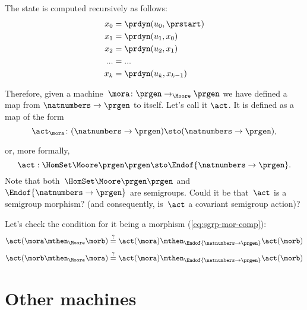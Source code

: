The state is computed recursively as follows:
\begin{equation}\label{eq:actions-on-sequences-x}
  \begin{aligned}
  x_0 &= \prdyn(u_0, \prstart) \\
  x_1 &= \prdyn(u_1, x_0) \\
  x_2 &= \prdyn(u_2, x_1) \\
  ... &= ... \\
  x_{k} &= \prdyn(u_{k}, x_{k-1})
  \end{aligned}
\end{equation}

Therefore, given a machine~$\mora \colon \prgen \to_{\Moore} \prgen$ we have defined a map from $\natnumbers \to \prgen$ to itself. Let's call it $\act$. It is defined as a map of the form
%
\begin{equation}\label{eq:actions-on-sequences-1}
\act_{\mora}\colon  (\natnumbers \to \prgen)  \sto  (\natnumbers \to \prgen),
\end{equation}

%
or, more formally,
%
  \begin{equation}\label{eq:actions-on-sequences-2}
    \act: \HomSet\Moore\prgen\prgen \sto \Endof {\natnumbers \to \prgen}.
\end{equation}
%
Note that both~$\HomSet\Moore\prgen\prgen$ and $\Endof {\natnumbers \to \prgen}$ are semigroups.
Could it be that~$\act$ is a semigroup morphism? (and consequently, is~$\act$ a covariant semigroup action)?

Let's check the condition for it being a morphism (\cref{eq:sgrp-mor-comp}):
%
\begin{equation}\label{eq:actions-on-sequences-left}
  \act ( \mora \mthen_{\Moore} \morb) \stackrel{?}{=}  \act ( \mora) \mthen_{\Endof  {\natnumbers \to \prgen}} \act(\morb)
\end{equation}
%
\begin{equation}\label{eq:actions-on-sequences-right}
  \act ( \morb \mthen_{\Moore} \mora) \stackrel{?}{=}  \act ( \mora) \mthen_{\Endof  {\natnumbers \to \prgen}} \act(\morb)
\end{equation}


\section{Other machines}


